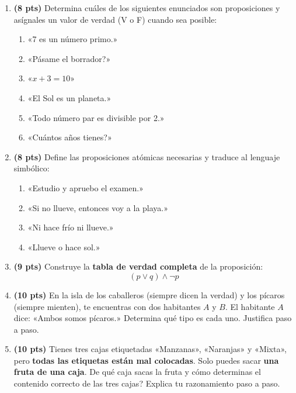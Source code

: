 \documentclass[12pt, letterpaper]{article}
\begin{document}
\begin{enumerate}[leftmargin=*]
  \item \textbf{(8 pts)} Determina cuáles de los siguientes enunciados son proposiciones y asígnales un valor de verdad (V o F) cuando sea posible:
        \begin{enumerate}[label=\alph*)]
          \item «7 es un número primo.»
          \item «\textquestiondown Pásame el borrador?»
          \item «$x + 3 = 10$»
          \item «El Sol es un planeta.»
          \item «Todo número par es divisible por 2.»
          \item «\textquestiondown Cuántos años tienes?»
        \end{enumerate}

  \item \textbf{(8 pts)} Define las proposiciones atómicas necesarias y traduce al lenguaje simbólico:
        \begin{enumerate}[label=\alph*)]
          \item «Estudio y apruebo el examen.»
          \item «Si no llueve, entonces voy a la playa.»
          \item «Ni hace frío ni llueve.»
          \item «Llueve o hace sol.»
        \end{enumerate}

  \item \textbf{(9 pts)} Construye la \textbf{tabla de verdad completa} de la proposición:
        \[
          (p \vee q) \wedge \neg p
        \]

  \item \textbf{(10 pts)} En la isla de los caballeros (siempre dicen la verdad) y los pícaros (siempre mienten), te encuentras con dos habitantes $A$ y $B$. El habitante $A$ dice: «Ambos somos pícaros.» Determina qué tipo es cada uno. Justifica paso a paso.

  \item \textbf{(10 pts)} Tienes tres cajas etiquetadas «Manzanas», «Naranjas» y «Mixta», pero \textbf{todas las etiquetas están mal colocadas}. Solo puedes sacar \textbf{una fruta de una caja}. \textquestiondown De qué caja sacas la fruta y cómo determinas el contenido correcto de las tres cajas? Explica tu razonamiento paso a paso.
\end{enumerate}
\end{document}

